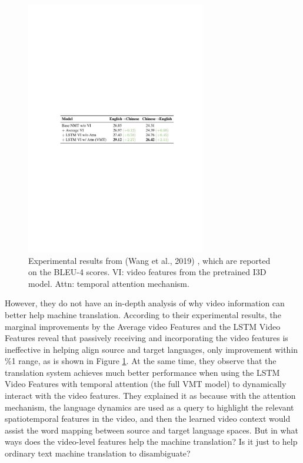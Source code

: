 \documentclass{article}
\begin{document}
	
	\begin{figure}[htbp] 
		\centering
		\includegraphics[width=0.7\textwidth]{results.pdf} 
		\caption{Experimental results from (Wang et al., 2019) \cite{wang2019vatex}, which are reported on the BLEU-4 scores. VI: video features from the pretrained I3D model. Attn: temporal attention mechanism.}
		\label{Fig.main2} 
	\end{figure}
	
	
However, they do not have an in-depth analysis of why video information can better help machine translation. According to their experimental results, the marginal improvements by the Average video Features and the LSTM Video Features reveal that passively receiving and incorporating the video features is ineffective in helping align source and target languages, only improvement within \%1 range, as is shown in Figure \ref{Fig.main2}. At the same time, they observe that the translation system achieves much better performance when using the LSTM Video Features with temporal attention (the full VMT model) to dynamically interact with the video features. They explained it as because with the attention mechanism, the language dynamics are used as a query to highlight the relevant spatiotemporal features in the video, and then the learned video context would assist the word mapping between source and target language spaces. But in what ways does the video-level features help the machine translation? Is it just to help ordinary text machine translation to disambiguate?
\end{document}

